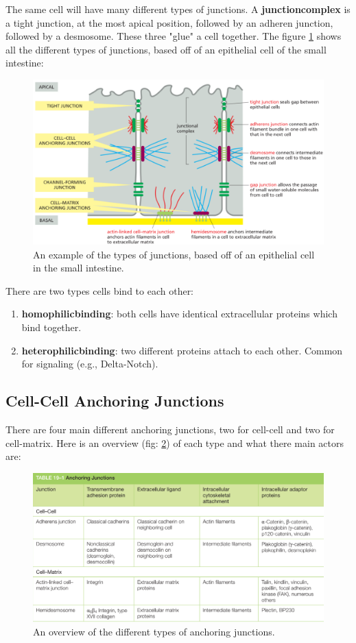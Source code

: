\documentclass[../main.tex]{subfiles}
\begin{document}
The same cell will have many different types of junctions. A \textbf{\gls{junctioncomplex}} is a tight junction, at the most apical position, followed by an adheren junction, followed by a desmosome. These three "glue" a cell together. The figure \ref{fig:junctoverex} shows all the different types of junctions, based off of an epithelial cell of the small intestine: 

\begin{figure}[H]
	\centering
	\includegraphics[width=0.7\linewidth]{junct_overex}
	\caption{An example of the types of junctions, based off of an epithelial cell in the small intestine.}
	\label{fig:junctoverex}
\end{figure}


There are two types cells bind to each other:
\begin{enumerate}
	\item \textbf{\textbf{\gls{homophilicbinding}}}: both cells have identical extracellular proteins which bind together.
	\item \textbf{\textbf{\gls{heterophilicbinding}}}: two different proteins attach to each other. Common for signaling (e.g., Delta-Notch).
\end{enumerate}

\subsection{Cell-Cell Anchoring Junctions}

There are four main different anchoring junctions, two for cell-cell and two for cell-matrix. Here is an overview (fig: \ref{fig:anchover}) of each type and what there main actors are:

\begin{figure}[H]
	\centering
	\includegraphics[width=0.7\linewidth]{anch_over}
	\caption{An overview of the different types of anchoring junctions.}
	\label{fig:anchover}
\end{figure}
\end{document}
